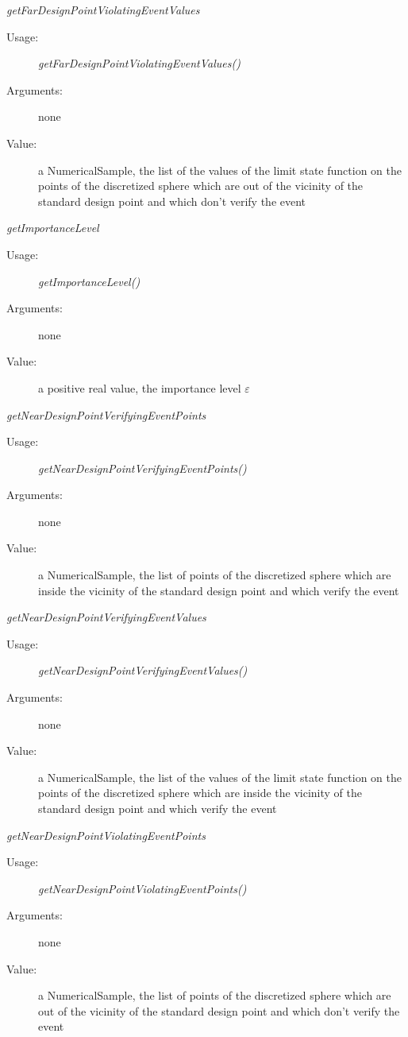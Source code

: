 \begin{description}
\begin{description}
\item \textit{getFarDesignPointViolatingEventValues}
\begin{description}
\item[Usage:] \textit{getFarDesignPointViolatingEventValues()}
\item[Arguments:] none
\item[Value:]   a NumericalSample, the list of the values of the limit state function on the points of the discretized sphere which are out of the vicinity of the standard design point and which don't verify the event
\end{description}
\bigskip

\item \textit{getImportanceLevel}
\begin{description}
\item[Usage:] \textit{getImportanceLevel()}
\item[Arguments:] none
\item[Value:]  a positive real value, the importance level $\varepsilon$
\end{description}
\bigskip

\item \textit{getNearDesignPointVerifyingEventPoints}
\begin{description}
\item[Usage:] \textit{getNearDesignPointVerifyingEventPoints()}
\item[Arguments:] none
\item[Value:]   a NumericalSample, the list of points of the discretized sphere which are inside the vicinity of the standard design point and which verify the event
\end{description}
\bigskip

\item \textit{getNearDesignPointVerifyingEventValues}
\begin{description}
\item[Usage:] \textit{getNearDesignPointVerifyingEventValues()}
\item[Arguments:] none
\item[Value:]   a NumericalSample, the list of the values of the limit state function on the points of the discretized sphere which are inside the vicinity of the standard design point and which verify the event
\end{description}
\bigskip

\item \textit{getNearDesignPointViolatingEventPoints}
\begin{description}
\item[Usage:] \textit{getNearDesignPointViolatingEventPoints()}
\item[Arguments:] none
\item[Value:]   a NumericalSample, the list of points of the discretized sphere which are out of the vicinity of the standard design point and which don't verify the event
\end{description}
\bigskip


\end{description}
\end{description}
